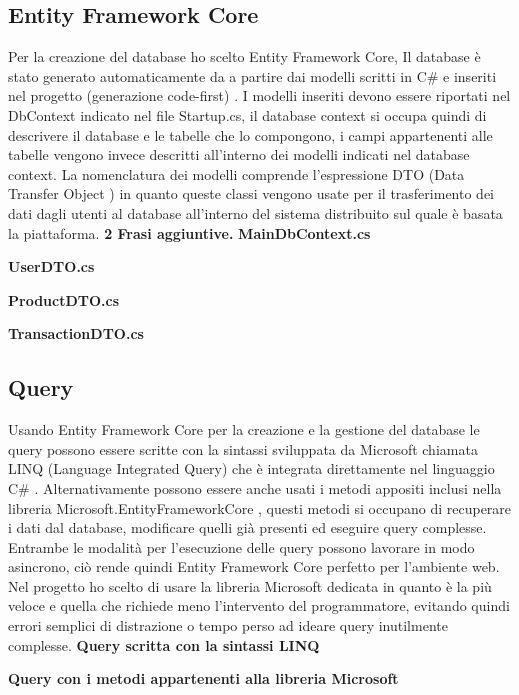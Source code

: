 \subsection{Entity Framework Core}
Per la creazione del database ho scelto Entity Framework Core, 
Il database è stato generato automaticamente da a partire dai modelli scritti in C\# e inseriti nel progetto (generazione code-first) \cite{EFcore}. I modelli inseriti devono essere riportati nel DbContext indicato nel file Startup.cs, il database context si occupa quindi di descrivere il database e le tabelle che lo compongono, i campi appartenenti alle tabelle vengono invece descritti all'interno dei modelli indicati nel database context. La nomenclatura dei modelli comprende l'espressione DTO (Data Transfer Object \cite{DTO}) in quanto queste classi vengono usate per il trasferimento dei dati dagli utenti al database all'interno del sistema distribuito sul quale è basata la piattaforma. \textbf{2 Frasi aggiuntive.}
\bigskip
\clearpage
\textbf{MainDbContext.cs}

\bigskip

\textbf{UserDTO.cs}

\bigskip

\textbf{ProductDTO.cs}

\bigskip

\textbf{TransactionDTO.cs}


\subsection{Query}
Usando Entity Framework Core per la creazione e la gestione del database le query possono essere scritte con la sintassi sviluppata da Microsoft chiamata LINQ (Language Integrated Query) che è integrata direttamente nel linguaggio C\# \cite{LINQ}. Alternativamente possono essere anche usati i metodi appositi inclusi nella libreria Microsoft.EntityFrameworkCore \cite{Microsoft.EFcore}, questi metodi si occupano di recuperare i dati dal database, modificare quelli già presenti ed eseguire query complesse. Entrambe le modalità per l'esecuzione delle query possono lavorare in modo asincrono, ciò rende quindi Entity Framework Core perfetto per l'ambiente web. Nel progetto ho scelto di usare la libreria Microsoft dedicata in quanto è la più veloce e quella che richiede meno l'intervento del programmatore, evitando quindi errori semplici di distrazione o tempo perso ad ideare query inutilmente complesse. 
\bigskip
\clearpage
\textbf{Query scritta con la sintassi LINQ}

\bigskip
\bigskip

\textbf{Query con i metodi appartenenti alla libreria Microsoft}
